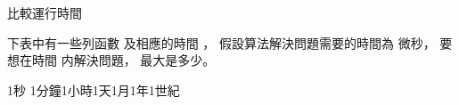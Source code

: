 \startsubject[
  title={Problems},
]
\startPROBLEM
比較運行時間

下表中有一些列函數  及相應的時間 ，
假設算法解決問題需要的時間為  微秒，
要想在時間  内解決問題，
 最大是多少。

\bTABLE[align=center]
\bTR \bTD \eTD \bTD 1秒 \eTD \bTD 1分鐘\eTD \bTD 1小時\eTD \bTD 1天\eTD \bTD 1月\eTD \bTD 1年\eTD \bTD 1世紀\eTD \eTR
\bTR \bTD {}   \eTD \bTD \eTD \bTD \eTD \bTD \eTD \bTD \eTD \bTD \eTD \bTD \eTD \bTD \eTD \eTR
\bTR \bTD {}\eTD \bTD \eTD \bTD \eTD \bTD \eTD \bTD \eTD \bTD \eTD \bTD \eTD \bTD \eTD \eTR
\bTR \bTD {}       \eTD \bTD \eTD \bTD \eTD \bTD \eTD \bTD \eTD \bTD \eTD \bTD \eTD \bTD \eTD \eTR
\bTR \bTD {}  \eTD \bTD \eTD \bTD \eTD \bTD \eTD \bTD \eTD \bTD \eTD \bTD \eTD \bTD \eTD \eTR
\bTR \bTD {}     \eTD \bTD \eTD \bTD \eTD \bTD \eTD \bTD \eTD \bTD \eTD \bTD \eTD \bTD \eTD \eTR
\bTR \bTD {}     \eTD \bTD \eTD \bTD \eTD \bTD \eTD \bTD \eTD \bTD \eTD \bTD \eTD \bTD \eTD \eTR
\bTR \bTD {}     \eTD \bTD \eTD \bTD \eTD \bTD \eTD \bTD \eTD \bTD \eTD \bTD \eTD \bTD \eTD \eTR
\bTR \bTD {}      \eTD \bTD \eTD \bTD \eTD \bTD \eTD \bTD \eTD \bTD \eTD \bTD \eTD \bTD \eTD \eTR
\eTABLE
\stopPROBLEM

